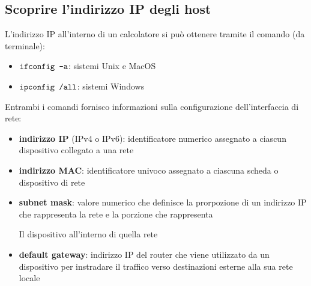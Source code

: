 \documentclass[12pt, a4paper, oneside]{book}
\begin{document}



    \subsection{Scoprire l’indirizzo IP degli host}
    L'indirizzo IP all'interno di un calcolatore si può ottenere tramite il comando (da terminale):
    \begin{itemize}[label=$\triangleright$]
      \item $\verb|ifconfig -a|$: sistemi Unix e MacOS
      \smallskip
      \item $\verb|ipconfig /all|$: sistemi Windows
    \end{itemize}

    Entrambi i comandi fornisco informazioni sulla configurazione dell'interfaccia di rete:
    \begin{itemize}[label=$\diamond$]
      \item \textbf{indirizzo IP} (IPv4 o IPv6): identificatore numerico assegnato a ciascun dispositivo collegato a una rete
      \smallskip
      \item \textbf{indirizzo MAC}: identificatore univoco assegnato a ciascuna scheda o dispositivo di rete
      \smallskip
      \item \textbf{subnet mask}: valore numerico che definisce la prorpozione di un indirizzo IP che rappresenta la rete e la porzione che rappresenta
      
      Il dispositivo all'interno di quella rete
      \smallskip
      \item \textbf{default gateway}: indirizzo IP del router che viene utilizzato da un dispositivo per instradare il traffico verso destinazioni esterne alla sua rete locale
    \end{itemize}
\end{document}
